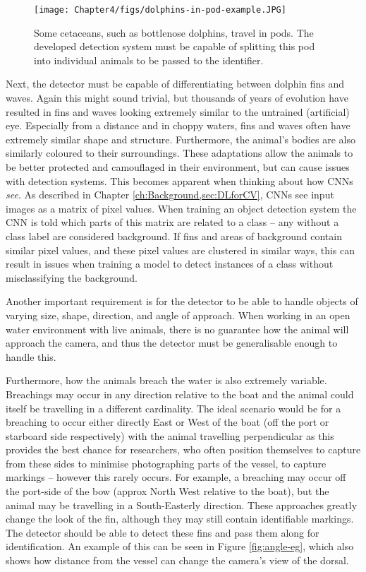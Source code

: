  \begin{figure}
 	\begin{center}
 		\texttt{[image: Chapter4/figs/dolphins-in-pod-example.JPG]}
 	\end{center}
 	\caption{Some cetaceans, such as bottlenose dolphins, travel in pods. The developed detection system must be capable of splitting this pod into individual animals to be passed to the identifier.
 	}
 	\label{fig:pod-eg}
 \end{figure}

 Next, the detector must be capable of differentiating between dolphin fins and waves. Again this might sound trivial, but thousands of years of evolution have resulted in fins and waves looking extremely similar to the untrained (artificial) eye. Especially from a distance and in choppy waters, fins and waves often have extremely similar shape and structure. Furthermore, the animal's bodies are also similarly coloured to their surroundings. These adaptations allow the animals to be better protected and camouflaged in their environment, but can cause issues with detection systems. This becomes apparent when thinking about how CNNs \textit{see}. As described in Chapter \ref{ch:Background,sec:DLforCV}, CNNs see input images as a matrix of pixel values. When training an object detection system the CNN is told which parts of this matrix are related to a class -- any without a class label are considered background. If fins and areas of background contain similar pixel values, and these pixel values are clustered in similar ways, this can result in issues when training a model to detect instances of a class without misclassifying the background. 
 
 Another important requirement is for the detector to be able to handle objects of varying size, shape, direction, and angle of approach. When working in an open water environment with live animals, there is no guarantee how the animal will approach the camera, and thus the detector must be generalisable enough to handle this. 
 
 Furthermore, how the animals breach the water is also extremely variable. Breachings may occur in any direction relative to the boat and the animal could itself be travelling in a different cardinality. The ideal scenario would be for a breaching to occur either directly East or West of the boat (off the port or starboard side respectively) with the animal travelling perpendicular as this provides the best chance for researchers, who often position themselves to capture from these sides to minimise photographing parts of the vessel, to capture markings -- however this rarely occurs. For example, a breaching may occur off the port-side of the bow (approx North West relative to the boat), but the animal may be travelling in a South-Easterly direction. These approaches greatly change the look of the fin, although they may still contain identifiable markings. The detector should be able to detect these fins and pass them along for identification. An example of this can be seen in Figure \ref{fig:angle-eg}, which also shows how distance from the vessel can change the camera's view of the dorsal. 
 

